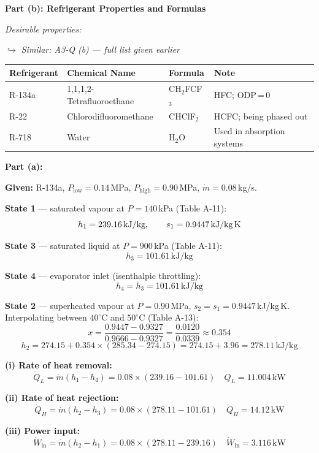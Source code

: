 \documentclass[12pt,a3paper]{article}
\newcommand{\variant}[1]{\par\vspace{1pt}\textcolor{blue!50!black}%
  {\footnotesize\textit{$\hookrightarrow$ Similar: #1}}}
\begin{document}
\begin{enumerate}
\begin{tcolorbox}[enhanced,breakable,ansbox,colback=cC!4,colframe=cC,
  boxrule=0.8pt,arc=5pt,
  title={\textbf{Solution}},fonttitle=\bfseries\color{white},colbacktitle=cC]
\hrulefill

\textbf{Part (b): Refrigerant Properties and Formulas}

\textit{Desirable properties:} \variant{A3-Q (b) — full list given earlier}

\begin{center}
\small
\begin{tabular}{@{}llll@{}}
\toprule
\textbf{Refrigerant} & \textbf{Chemical Name} & \textbf{Formula} & \textbf{Note} \\
\midrule
R-134a & 1,1,1,2-Tetrafluoroethane & CH$_2$FCF$_3$ & HFC; ODP\,=\,0 \\
R-22   & Chlorodifluoromethane     & CHClF$_2$     & HCFC; being phased out \\
R-718  & Water                     & H$_2$O        & Used in absorption systems \\
\bottomrule
\end{tabular}
\end{center}


\medskip
\textbf{Part (a):}

\textbf{Given:} R-134a,\;
$P_\text{low} = 0.14$\,MPa,\;
$P_\text{high} = 0.90$\,MPa,\;
$\dot{m} = 0.08$\,kg/s.

\medskip
\textbf{State 1} --- saturated vapour at $P = 140$\,kPa (Table A-11):
\[
  h_1 = 239.16\,\text{kJ/kg}, \qquad s_1 = 0.9447\,\text{kJ/kg\,K}
\]

\textbf{State 3} --- saturated liquid at $P = 900$\,kPa (Table A-11):
\[
  h_3 = 101.61\,\text{kJ/kg}
\]

\textbf{State 4} --- evaporator inlet (isenthalpic throttling):
\[
  h_4 = h_3 = 101.61\,\text{kJ/kg}
\]

\textbf{State 2} --- superheated vapour at $P = 0.90$\,MPa,
$s_2 = s_1 = 0.9447$\,kJ/kg\,K.
Interpolating between $40^\circ$C and $50^\circ$C (Table A-13):
\[
  x = \frac{0.9447 - 0.9327}{0.9666 - 0.9327}
    = \frac{0.0120}{0.0339} \approx 0.354
\]
\[
  h_2 = 274.15 + 0.354\times(285.34 - 274.15)
      = 274.15 + 3.96
      = 278.11\,\text{kJ/kg}
\]

\medskip
\textbf{(i) Rate of heat removal:}
\[
  \dot{Q}_L = \dot{m}(h_1 - h_4)
  = 0.08\times(239.16 - 101.61)
  \quad\boxed{\dot{Q}_L = 11.004\,\text{kW}}
\]

\textbf{(ii) Rate of heat rejection:}
\[
  \dot{Q}_H = \dot{m}(h_2 - h_3)
  = 0.08\times(278.11 - 101.61)
  \quad\boxed{\dot{Q}_H = 14.12\,\text{kW}}
\]

\textbf{(iii) Power input:}
\[
  \dot{W}_\text{in} = \dot{m}(h_2 - h_1)
  = 0.08\times(278.11 - 239.16)
  \quad\boxed{\dot{W}_\text{in} = 3.116\,\text{kW}}
\]


\end{tcolorbox}
\end{enumerate}
\end{document}
